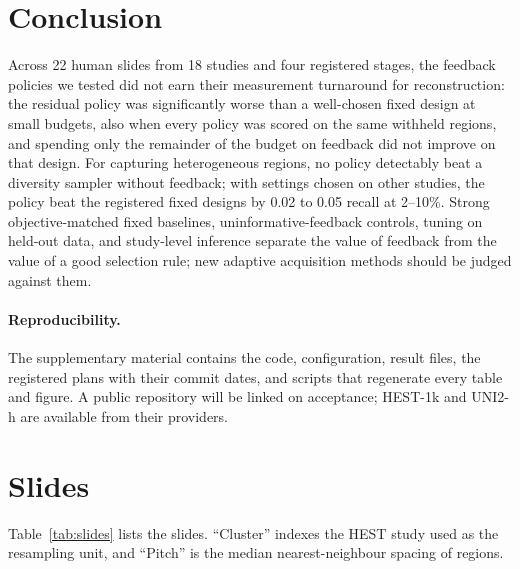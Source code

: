 \documentclass[10pt]{article}
\newcommand{\fittable}[1]{\resizebox{\ifdim\width>\linewidth\linewidth\else\width\fi}{!}{#1}}
\begin{document}
\section{Conclusion}

Across 22 human slides from 18 studies and four registered stages, the feedback policies we tested did not earn their
measurement turnaround for reconstruction: the residual policy was significantly worse than a well-chosen fixed design at small budgets,
also when every policy was scored on the same withheld regions, and spending only the remainder of the budget on
feedback did not improve on that design. For capturing heterogeneous regions, no policy detectably beat a
diversity sampler without feedback; with settings chosen on other studies, the policy beat the registered fixed
designs by 0.02 to 0.05 recall at 2--10\%. Strong objective-matched fixed baselines, uninformative-feedback
controls, tuning on held-out data, and study-level inference separate the value of feedback from the value of a
good selection rule; new adaptive acquisition methods should be judged against them.

\paragraph{Reproducibility.}
The supplementary material contains the code, configuration, result files, the registered plans with their commit
dates, and scripts that regenerate every table and figure. A public repository will be linked on acceptance; HEST-1k
and UNI2-h are available from their providers.




\clearpage
\appendix
\raggedbottom

\section{Slides}
\label{app:slides}

Table~\ref{tab:slides} lists the slides. ``Cluster'' indexes the HEST study used as the resampling unit, and ``Pitch''
is the median nearest-neighbour spacing of regions.

\begin{table}[H]
\centering
\caption{The 22 slides (HEST-1k v1.3 metadata).}
\label{tab:slides}
\fittable{}
\end{table}
\end{document}
